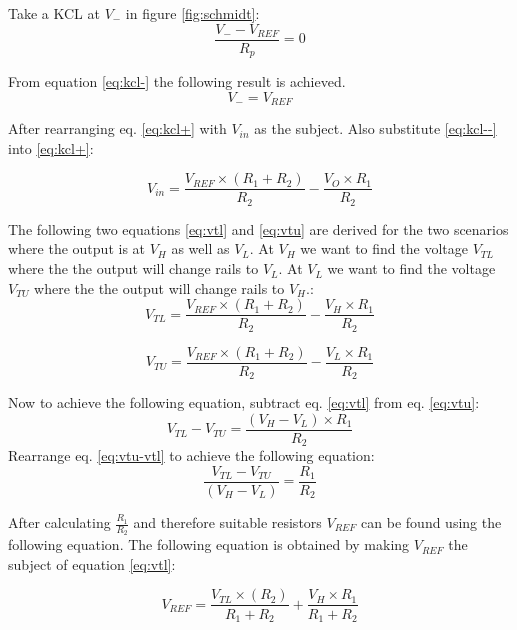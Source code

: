 		
Take a KCL at $V_-$ in figure \ref{fig:schmidt}:
\begin{equation}
	\frac{V_--V_{REF}}{R_p}=0
	\label{eq:kcl-}
\end{equation}

From equation \ref{eq:kcl-} the following result is achieved.
\begin{equation}
	V_-=V_{REF}
	\label{eq:kcl--}
\end{equation}


After rearranging eq. \ref{eq:kcl+} with $V_{in}$ as the subject. Also substitute \ref{eq:kcl--} into \ref{eq:kcl+}:

		\begin{equation}
V_{in}=\frac{V_{REF}\times (R_1+R_2)}{R_2}-\frac{V_{O}\times R_1}{R_2}
\end{equation}

The following two equations \ref{eq:vtl} and \ref{eq:vtu} are derived for the two scenarios where the output is at $V_H$ as well as $V_L$. At $V_H$ we want to find the voltage $V_{TL}$ where the the output will change rails to $V_L$. At $V_L$ we want to find the voltage $V_{TU}$ where the the output will change rails to $V_H$.:
\begin{equation}
	V_{TL}=\frac{V_{REF}\times (R_1+R_2)}{R_2}-\frac{V_{H}\times R_1}{R_2}
	\label{eq:vtl}
\end{equation}
	
	
	\begin{equation}
	V_{TU}=\frac{V_{REF}\times (R_1+R_2)}{R_2}-\frac{V_{L}\times R_1}{R_2}
	\label{eq:vtu}
\end{equation}

Now to achieve the following equation, subtract eq. \ref{eq:vtl} from eq. \ref{eq:vtu}:
\begin{equation}
		V_{TL}-V_{TU}=\frac{(V_{H}-V_L)\times R_1}{R_2}
			\label{eq:vtu-vtl}
	\end{equation}
		Rearrange eq. \ref{eq:vtu-vtl} to achieve the following equation:
		\begin{equation}
	\frac{V_{TL}-V_{TU}}{(V_{H}-V_L)}=\frac{R_1}{R_2}
\end{equation}

After calculating $\frac{R_1}{R_2}$ and therefore suitable resistors $V_{REF}$ can be found using the following equation. The following equation is obtained by making $V_{REF}$ the subject of equation \ref{eq:vtl}:

\begin{equation}
	V_{REF}=\frac{V_{TL}\times (R_2)}{R_1+R_2}+\frac{V_{H}\times R_1}{R_1+R_2}
	\label{eq:reff}
\end{equation}


